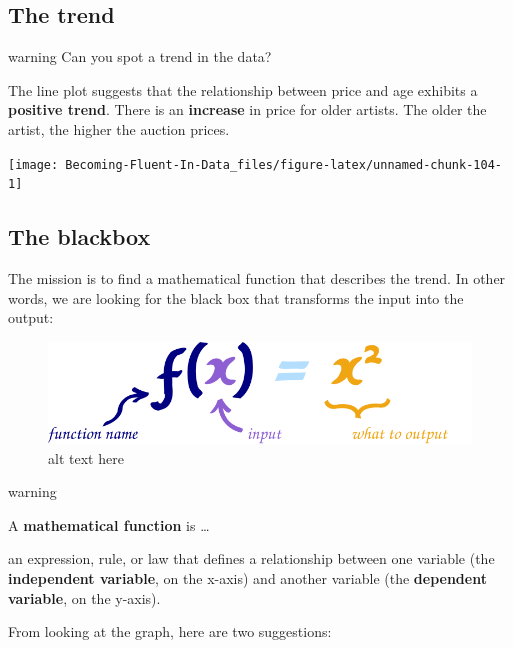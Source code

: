\documentclass[
]{book}
\begin{document}
\hypertarget{the-trend}{%
\subsection{The trend}\label{the-trend}}

\begin{infobox}warning
Can you spot a trend in the data?

\end{infobox}

The line plot suggests that the relationship between price and age exhibits a \textbf{positive trend}. There is an \textbf{increase} in price for older artists. The older the artist, the higher the auction prices.

\begin{center}\texttt{[image: Becoming-Fluent-In-Data\_files/figure-latex/unnamed-chunk-104-1]} \end{center}

\hypertarget{the-blackbox}{%
\subsection{The blackbox}\label{the-blackbox}}

The mission is to find a mathematical function that describes the trend. In other words, we are looking for the black box that transforms the input into the output:

\begin{figure}
\centering
\includegraphics{images/function-fx-x2.svg}
\caption{alt text here}
\end{figure}

\begin{infobox}warning

A \textbf{mathematical function} is \ldots{}

an expression, rule, or law that defines a relationship between one variable (the \textbf{independent variable}, on the x-axis) and another variable (the \textbf{dependent variable}, on the y-axis).

\end{infobox}

From looking at the graph, here are two suggestions:
\end{document}
